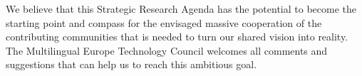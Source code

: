 \documentclass[10pt, plain]{../../metanetpaper}
\begin{document}
\begin{multicols}{2}
We believe that this Strategic Research Agenda has the potential to become the starting point and compass for the envisaged massive cooperation of the contributing communities that is needed to turn our shared vision into reality. The Multilingual Europe Technology Council welcomes all comments and suggestions that can help us to reach this ambitious goal.
\end{multicols}







\clearpage



\end{document}
